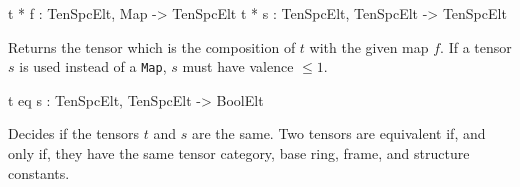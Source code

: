 \begin{intrinsics}
t * f : TenSpcElt, Map -> TenSpcElt
t * s : TenSpcElt, TenSpcElt -> TenSpcElt
\end{intrinsics}

Returns the tensor which is the composition of $t$ with the given map $f$.
If a tensor $s$ is used instead of a \texttt{Map}, $s$ must have valence $\leq 1$. 

\begin{intrinsics}
t eq s : TenSpcElt, TenSpcElt -> BoolElt
\end{intrinsics}

Decides if the tensors $t$ and $s$ are the same. Two tensors are equivalent if,
and only if, they have the same tensor category, base ring, frame, and structure
constants. 

